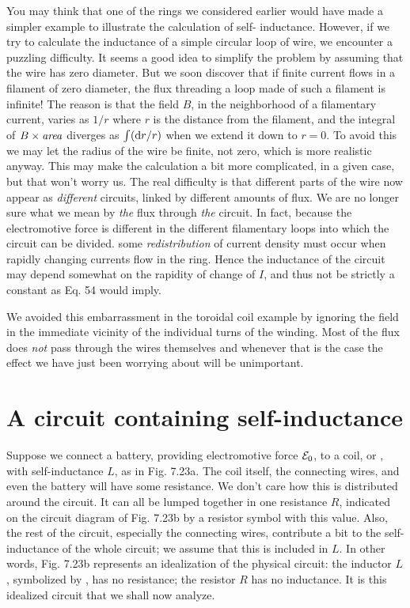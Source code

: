 You may think that one of the rings we considered earlier would
have made a simpler example to illustrate the calculation of self-
inductance. However, if we try to calculate the inductance of a
simple circular loop of wire, we encounter a puzzling difficulty. It
seems a good idea to simplify the problem by assuming that the wire
has zero diameter. But we soon discover that if finite current flows
in a filament of zero diameter, the flux threading a loop made of such
a filament is infinite! The reason is that the field $B$, in the neighborhood
of a filamentary current, varies as $1/r$ where $r$ is the distance
from the filament, and the integral of $B\times\text{\emph{area}}$ diverges as $\int(\textup{d} r/r)$
when we extend it down to $r = 0$. To avoid this we may let the radius
of the wire be finite, not zero, which is more realistic anyway. This
may make the calculation a bit more complicated, in a given case,
but that won't worry us. The real difficulty is that different parts of
the wire now appear as \emph{different} circuits, linked by different amounts
of flux. We are no longer sure what we mean by \emph{the} flux through \emph{the}
circuit. In fact, because the electromotive force is different in the
different filamentary loops into which the circuit can be divided. some
\emph{redistribution} of current density must occur when rapidly changing
currents flow in the ring. Hence the inductance of the circuit may
depend somewhat on the rapidity of change of $I$, and thus not be
strictly a constant as Eq. 54 would imply.

We avoided this embarrassment in the toroidal coil example by
ignoring the field in the immediate vicinity of the individual turns of
the winding. Most of the flux does \emph{not} pass through the wires themselves
and whenever that is the case the effect we have just been
worrying about will be unimportant.

\section{A circuit containing self-inductance}

Suppose we connect a battery, providing electromotive force $\mathcal{E}_0$,
to a coil, or , with self-inductance $L$, as in Fig. 7.23a. The
coil itself, the connecting wires, and even the battery will have some
resistance. We don't care how this is distributed around the circuit.
It can all be lumped together in one resistance $R$, indicated on the
circuit diagram of Fig. 7.23b by a resistor symbol with this value.
Also, the rest of the circuit, especially the connecting wires, contribute
a bit to the self-inductance of the whole circuit; we assume that
this is included in $L$. In other words, Fig. 7.23b represents an
idealization of the physical circuit: the inductor $L$, symbolized by
,
has no resistance; the resistor $R$ has no inductance. It is
this idealized circuit that we shall now analyze.

